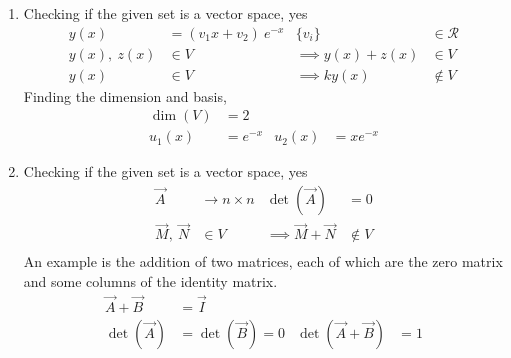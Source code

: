 \begin{enumerate}
    \item Checking if the given set is a vector space, \textcolor{y_h}{yes}
          \begin{align}
              y(x)                 & = (v_1 x + v_2)\ e^{-x} &
              \{v_i\}              & \in \mathcal{R}           \\
              y(x),\ z(x)          & \in V                   &
              \implies y(x) + z(x) & \in V                     \\
              y(x)                 & \in V                   &
              \implies ky(x)       & \not\in V
          \end{align}
          Finding the dimension and basis,
          \begin{align}
              \dim(V) & = 2         \\
              u_1(x)  & = e^{-x}  &
              u_2(x)  & = xe^{-x}
          \end{align}

    \item Checking if the given set is a vector space, \textcolor{y_h}{yes}
          \begin{align}
              \vec{A}                    & \to n \times n &
              \det(\vec{A})              & = 0              \\
              \vec{M},\ \vec{N}          & \in V          &
              \implies \vec{M} + \vec{N} & \not\in V        \\
          \end{align}
          An example is the addition of two matrices, each of which are the zero matrix
          and some columns of the identity matrix.
          \begin{align}
              \vec{A} + \vec{B}       & = \vec{I}             \\
              \det(\vec{A})           & = \det(\vec{B}) = 0 &
              \det(\vec{A} + \vec{B}) & = 1
          \end{align}


\end{enumerate}
